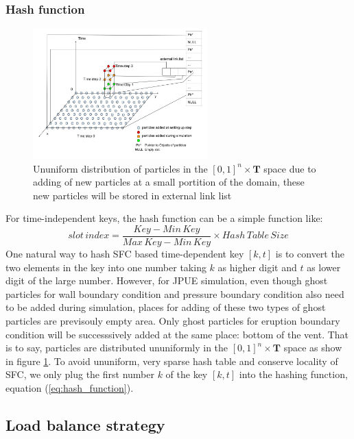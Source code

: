 \documentclass[10pt,a4paper]{article}
\begin{document}
\subsubsection{Hash function}
\begin{figure}[h]
\caption{Ununiform distribution of particles in the $[0,1]^n \times \textbf{T}$ space due to adding of new particles at a small portition of the domain, these new particles will be stored in external link list}
\centering
\label{fig:Particle_adding_with_link}
\includegraphics[width=0.6\textwidth]{Particle_adding_with_link}
\end{figure} 
For time-independent keys, the hash function can be a simple function like:
\begin{equation}
\label{eq:hash_function}
slot\,index = \frac{Key - Min\,Key}{Max\,Key - Min\,Key} \times Hash\,Table\,Size 
\end{equation}
One natural way to hash SFC based time-dependent key $[k,t]$ is to convert the two elements in the key into one number taking $k$ as higher digit and $t$ as lower digit of the large number. However, for JPUE simulation, even though ghost particles for wall boundary condition and pressure boundary condition also need to be added during simulation, places for adding of these two types of ghost particles are previsouly empty area. Only ghost particles for eruption boundary condition will be successsively added at the same place: bottom of the vent. That is to say, particles are distributed ununiformly in the $[0,1]^n \times \textbf{T}$ space as show in figure \ref{fig:Particle_adding_with_link}. To avoid ununiform, very sparse hash table and conserve locality of SFC, we only plug the first number $k$ of the key $[k,t]$ into the hashing function, equation (\ref{eq:hash_function}). 

\subsection{Load balance strategy}
\end{document}
